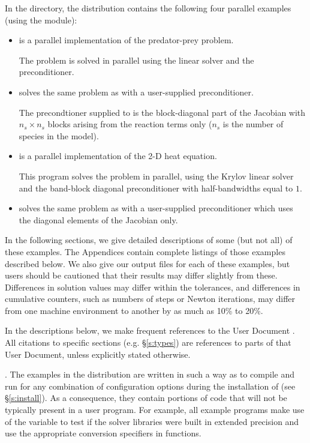 In the  directory, the {\ida} 
distribution contains the following four parallel examples 
(using the {\nvecp} module):
\begin{itemize}

\item {}
  is a parallel implementation of the predator-prey problem.

  The problem is solved in parallel using the {\idaspgmr} linear
  solver and the {\idabbdpre} preconditioner.

\item {}
  solves the same problem as  with a user-supplied preconditioner.
  
  The precondtioner supplied to {\idaspgmr} is the block-diagonal part of 
  the Jacobian with $n_s \times n_s$ blocks arising from the reaction terms only
  ($n_s$ is the number of species in the model).

\item {}
  is a parallel implementation of the 2-D heat equation.

  This program solves the problem in parallel, using the Krylov linear solver
  {\idaspgmr} and the band-block diagonal preconditioner {\idabbdpre} with
  half-bandwidths equal to $1$.

\item {}
  solves the same problem as  with a user-supplied preconditioner
  which uses the diagonal elements of the Jacobian only.
  
\end{itemize}

\vspace{0.2in}\noindent 
In the following sections, we give detailed descriptions of some (but
not all) of these examples.  The Appendices contain complete listings
of those examples described below.  We also give our output files for
each of these examples, but users should be cautioned that their
results may differ slightly from these.  Differences in solution
values may differ within the tolerances, and differences in cumulative
counters, such as numbers of steps or Newton iterations, may differ
from one machine environment to another by as much as 10\% to 20\%.

In the descriptions below, we make frequent references to the {\ida}
User Document \cite{ida2.2.0_ug}.  All citations to specific sections
(e.g. \S\ref{s:types}) are references to parts of that User Document, unless
explicitly stated otherwise.

\vspace{0.2in}. 
The examples in the {\ida} distribution are written in such a way as
to compile and run for any combination of configuration options during
the installation of {\sundials} (see \S\ref{s:install}). As a consequence,
they contain portions of code that will not be typically present in a
user program. For example, all example programs make use of the
variable  to test if the solver libraries
were built in extended precision and use the appropriate conversion 
specifiers in  functions.